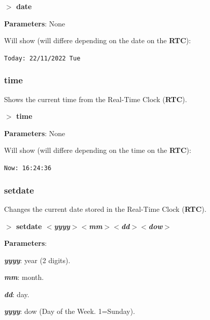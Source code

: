 \documentclass[a4paper,11pt]{article}
\begin{document}
        \hspace{1.9cm}\textbf{$>$ date}

        \textbf{Parameters}: None

        Will show (will differe depending on the date on the \textbf{RTC}):

        \hspace{1cm}\texttt{Today:\ 22/11/2022 Tue}

        \subsubsection{{\color{blue}time}}
        Shows the current time from the Real-Time Clock (\textbf{RTC}).

        \hspace{1.9cm}\textbf{$>$ time}

        \textbf{Parameters}: None

        Will show (will differe depending on the time on the \textbf{RTC}):

        \hspace{1cm}\texttt{Now:\ 16:24:36}

        \subsubsection{{\color{blue}setdate}}
        Changes the current date stored in the Real-Time Clock (\textbf{RTC}).

        \hspace{1.9cm}\textbf{$>$ setdate \textit{$<$yyyy$>$$<$mm$>$$<$dd$>$$<$dow$>$}}

        \textbf{Parameters}:

        \hspace{1cm}\textbf{\textit{yyyy}}: year (2 digits).

        \hspace{1cm}\textbf{\textit{mm}}: month.

        \hspace{1cm}\textbf{\textit{dd}}: day.

        \hspace{1cm}\textbf{\textit{yyyy}}: dow (Day of the Week. 1=Sunday).
\end{document}

